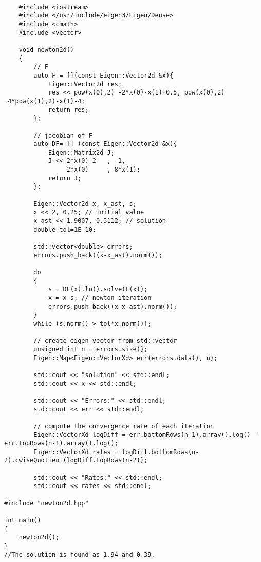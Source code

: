 \documentclass[xcolor=dvipsnames]{beamer}
\begin{document}
{
\begin{frame}[fragile,shrink=20]
	\lstset{language=C++}
\begin{lstlisting}

	#include <iostream>
	#include </usr/include/eigen3/Eigen/Dense>
	#include <cmath>
	#include <vector>

	void newton2d()
	{
		// F
		auto F = [](const Eigen::Vector2d &x){ 
	   		Eigen::Vector2d res;
			res << pow(x(0),2) -2*x(0)-x(1)+0.5, pow(x(0),2) +4*pow(x(1),2)-x(1)-4;
			return res;
		};

		// jacobian of F
		auto DF= [] (const Eigen::Vector2d &x){
			Eigen::Matrix2d J;
			J << 2*x(0)-2	, -1, 
			  	 2*x(0)		, 8*x(1);
		  	return J;
		};	

		Eigen::Vector2d x, x_ast, s;
		x << 2, 0.25; // initial value
		x_ast << 1.9007, 0.3112; // solution
	   	double tol=1E-10;

		std::vector<double> errors;
		errors.push_back((x-x_ast).norm());

		do
		{
			s = DF(x).lu().solve(F(x));
		   	x = x-s; // newton iteration
			errors.push_back((x-x_ast).norm());
		}
		while (s.norm() > tol*x.norm());

		// create eigen vector from std::vector
		unsigned int n = errors.size();
		Eigen::Map<Eigen::VectorXd> err(errors.data(), n);

		std::cout << "solution" << std::endl;
		std::cout << x << std::endl;
		
		std::cout << "Errors:" << std::endl;
		std::cout << err << std::endl;

		// compute the convergence rate of each iteration	
		Eigen::VectorXd logDiff = err.bottomRows(n-1).array().log() - err.topRows(n-1).array().log();
		Eigen::VectorXd rates = logDiff.bottomRows(n-2).cwiseQuotient(logDiff.topRows(n-2));
		
		std::cout << "Rates:" << std::endl;
		std::cout << rates << std::endl;

#include "newton2d.hpp"

int main()
{
	newton2d();
}
//The solution is found as 1.94 and 0.39.
\end{lstlisting}
\end{frame}
}
\end{document}
